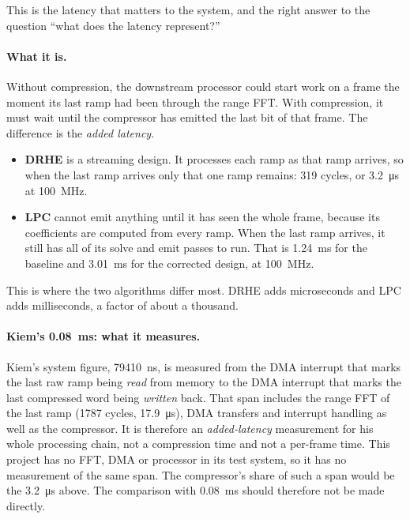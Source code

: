 This is the latency that matters to the system, and the right answer to the
question ``what does the latency represent?''

\paragraph{What it is.} Without compression, the downstream processor could
start work on a frame the moment its last ramp had been through the range FFT.
With compression, it must wait until the compressor has emitted the last bit of
that frame. The difference is the \emph{added latency}.

\begin{itemize}
\item \textbf{DRHE} is a streaming design. It processes each ramp as that ramp
arrives, so when the last ramp arrives only that one ramp remains:
\num{319} cycles, or \SI{3.2}{\micro\second} at \SI{100}{\mega\hertz}.
\item \textbf{LPC} cannot emit anything until it has seen the whole frame,
because its coefficients are computed from every ramp. When the last ramp
arrives, it still has all of its solve and emit passes to run. That is
\SI{1.24}{\milli\second} for the baseline and \SI{3.01}{\milli\second} for the
corrected design, at \SI{100}{\mega\hertz}.
\end{itemize}

\noindent
This is where the two algorithms differ most. DRHE adds microseconds and LPC
adds milliseconds, a factor of about a thousand.

\paragraph{Kiem's \SI{0.08}{\milli\second}: what it measures.} Kiem's system
figure, \SI{79410}{\nano\second}, is measured from the DMA interrupt that
marks the last raw ramp being \emph{read} from memory to the DMA interrupt that
marks the last compressed word being \emph{written} back. That span includes
the range FFT of the last ramp (\num{1787} cycles, \SI{17.9}{\micro\second}),
DMA transfers and interrupt handling as well as the compressor. It is therefore
an \emph{added-latency} measurement for his whole processing chain, not a
compression time and not a per-frame time. This project has no FFT, DMA or
processor in its test system, so it has no measurement of the same span. The
compressor's share of such a span would be the \SI{3.2}{\micro\second} above.
The comparison with \SI{0.08}{\milli\second} should therefore not be made
directly.

